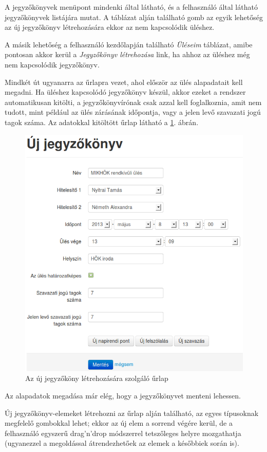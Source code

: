 \documentclass[a4paper,12pt,oneside]{report}
\begin{document}
A jegyzőkönyvek menüpont mindenki által látható, és a felhasználó által látható jegyzőkönyvek listájára mutat. A táblázat alján található gomb az egyik lehetőség az új jegyzőkönyv létrehozására \textendash{} ekkor az nem kapcsolódik üléshez.

A másik lehetőség a felhasználó kezdőlapján található {\it Üléseim} táblázat, amibe pontosan akkor kerül a {\it Jegyzőkönyv létrehozása} link, ha ahhoz az üléshez még nem kapcsolódik jegyzőkönyv.

Mindkét út ugyanarra az űrlapra vezet, ahol először az ülés alapadatait kell megadni. Ha üléshez kapcsolódó jegyzőkönyv készül, akkor ezeket a rendszer automatikusan kitölti, a jegyzőkönyvírónak csak azzal kell foglalkoznia, amit nem tudott, mint például az ülés zárásának időpontja, vagy a jelen levő szavazati jogú tagok száma. Az adatokkal kitöltött űrlap látható a \ref{fig:jegyzokonyv_uj}. ábrán.

\begin{figure}[h]
    \centering
    \includegraphics[width=.9\textwidth]{jegyzokonyv_uj.png}
    \caption{Az új jegyzőköny létrehozására szolgáló űrlap}
    \label{fig:jegyzokonyv_uj}
\end{figure}

Az alapadatok megadása már elég, hogy a jegyzőkönyvet menteni lehessen.

Új jegyzőkönyv-elemeket létrehozni az űrlap alján található, az egyes típusoknak megfelelő gombokkal lehet; ekkor az új elem a sorrend végére kerül, de a felhasználó egyszerű drag'n'drop módszerrel tetszőleges helyre mozgathatja (ugyanezzel a megoldással átrendezhetőek az elemek a későbbiek során is).
\end{document}
